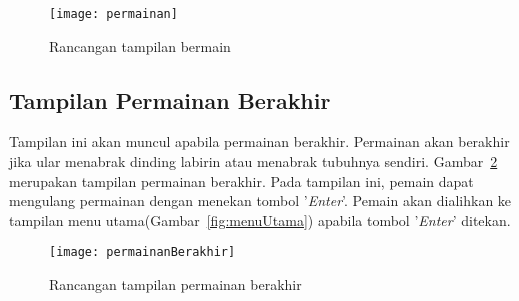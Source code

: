 \begin{figure}[H]
	\centering  
	\texttt{[image: permainan]}  
	\caption[Rancangan tampilan bermain]{Rancangan tampilan bermain}
	\label{fig:permainan} 
\end{figure}

\subsection{Tampilan Permainan Berakhir}
Tampilan ini akan muncul apabila permainan berakhir. Permainan akan berakhir jika ular menabrak dinding labirin atau menabrak tubuhnya sendiri. Gambar~\ref{fig:permainanBerakhir} merupakan tampilan permainan berakhir. Pada tampilan ini, pemain dapat mengulang permainan dengan menekan tombol '\textit{Enter}'. Pemain akan dialihkan ke tampilan menu utama(Gambar~\ref{fig:menuUtama}) apabila tombol '\textit{Enter}' ditekan.

\begin{figure}[H]
	\centering  
	\texttt{[image: permainanBerakhir]}  
	\caption[Rancangan tampilan permainan berakhir]{Rancangan tampilan permainan berakhir}
	\label{fig:permainanBerakhir} 
\end{figure}